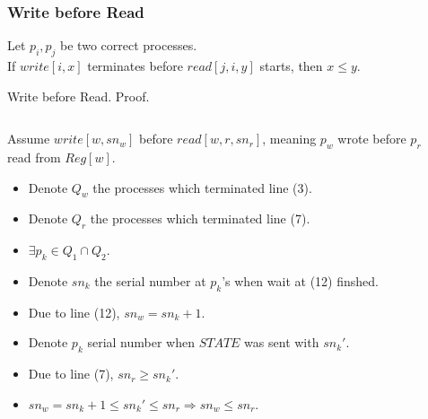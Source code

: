         
\begin{frame}
    \frametitle{Write before Read}
    \begin{lemma}
        Let $p_i, p_j$ be two correct processes.\\
        If $write[i,x]$ terminates before $read[j,i,y]$ starts, then $x\leq y$.
    \end{lemma}
\end{frame}
\begin{frame}{Write before Read. Proof.}
    \begin{columns}[T]
        \begin{column}{.5\textwidth}
            Assume $write[w,sn_w]$ before $read[w,r,sn_r]$, meaning $p_w$ wrote 
            before $p_r$ read from $Reg[w]$.
            \begin{itemize}
                \item Denote $Q_w$ the processes which terminated line (3).
                \item Denote $Q_r$ the processes which terminated line (7).
                \item $\exists p_k\in Q_1\cap Q_2$.
                \item Denote $sn_k$ the serial number at $p_k$'s when wait at (12) finshed.
                \item Due to line (12), $sn_w=sn_k+1$.
                \item Denote $p_k$ serial number when $STATE$ was sent with $sn_k'$.
                \item Due to line (7), $sn_r\geq sn_k'$.
                \item $sn_w=sn_k+1\leq sn_k'\leq sn_r\Rightarrow sn_w\leq sn_r$.
            \end{itemize}
        \end{column}
        \begin{column}{.5\textwidth}

\end{column}
\end{columns}
\end{frame}
